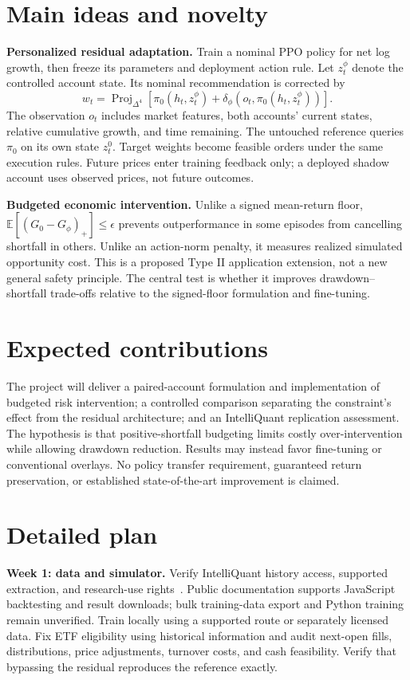 \documentclass[10pt]{article}
\begin{document}
\section{Main ideas and novelty}
\textbf{Personalized residual adaptation.} Train a nominal PPO policy for net log growth, then freeze its parameters and deployment action rule. Let $z_t^\phi$ denote the controlled account state. Its nominal recommendation is corrected by
\begin{equation}
 w_t=\operatorname{Proj}_{\Delta^4}\left[
 \pi_0(h_t,z_t^\phi)+\delta_\phi(o_t,\pi_0(h_t,z_t^\phi))\right].
\end{equation}
The observation $o_t$ includes market features, both accounts' current states, relative cumulative growth, and time remaining. The untouched reference queries $\pi_0$ on its own state $z_t^0$. Target weights become feasible orders under the same execution rules. Future prices enter training feedback only; a deployed shadow account uses observed prices, not future outcomes.

\textbf{Budgeted economic intervention.} Unlike a signed mean-return floor, $\mathbb E[(G_0-G_\phi)_+]\leq\epsilon$ prevents outperformance in some episodes from cancelling shortfall in others. Unlike an action-norm penalty, it measures realized simulated opportunity cost. This is a proposed Type II application extension, not a new general safety principle. The central test is whether it improves drawdown--shortfall trade-offs relative to the signed-floor formulation and fine-tuning.

\newpage
\section{Expected contributions}
The project will deliver a paired-account formulation and implementation of budgeted risk intervention; a controlled comparison separating the constraint's effect from the residual architecture; and an IntelliQuant replication assessment. The hypothesis is that positive-shortfall budgeting limits costly over-intervention while allowing drawdown reduction. Results may instead favor fine-tuning or conventional overlays. No policy transfer requirement, guaranteed return preservation, or established state-of-the-art improvement is claimed.

\section{Detailed plan}
\textbf{Week 1: data and simulator.} Verify IntelliQuant history access, supported extraction, and research-use rights~\cite{iq}. Public documentation supports JavaScript backtesting and result downloads; bulk training-data export and Python training remain unverified. Train locally using a supported route or separately licensed data. Fix ETF eligibility using historical information and audit next-open fills, distributions, price adjustments, turnover costs, and cash feasibility. Verify that bypassing the residual reproduces the reference exactly.
\end{document}
